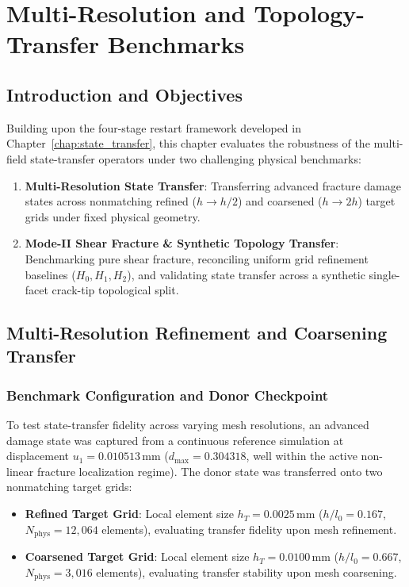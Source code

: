 \chapter{Multi-Resolution and Topology-Transfer Benchmarks}
\label{chap:multiresolution_topology}

\section{Introduction and Objectives}
\label{sec:topo_intro}

Building upon the four-stage restart framework developed in Chapter~\ref{chap:state_transfer}, this chapter evaluates the robustness of the multi-field state-transfer operators under two challenging physical benchmarks:
\begin{enumerate}
    \item \textbf{Multi-Resolution State Transfer}: Transferring advanced fracture damage states across nonmatching refined ($h \to h/2$) and coarsened ($h \to 2h$) target grids under fixed physical geometry.
    \item \textbf{Mode-II Shear Fracture \& Synthetic Topology Transfer}: Benchmarking pure shear fracture, reconciling uniform grid refinement baselines ($H_0, H_1, H_2$), and validating state transfer across a synthetic single-facet crack-tip topological split.
\end{enumerate}

\section{Multi-Resolution Refinement and Coarsening Transfer}
\label{sec:topo_multiresolution}

\subsection{Benchmark Configuration and Donor Checkpoint}
To test state-transfer fidelity across varying mesh resolutions, an advanced damage state was captured from a continuous reference simulation at displacement $u_1 = 0.010513\,\text{mm}$ ($d_{\max} = 0.304318$, well within the active non-linear fracture localization regime). The donor state was transferred onto two nonmatching target grids:
\begin{itemize}
    \item \textbf{Refined Target Grid}: Local element size $h_T = 0.0025\,\text{mm}$ ($h/l_0 = 0.167$, $N_{\mathrm{phys}} = 12,064$ elements), evaluating transfer fidelity upon mesh refinement.
    \item \textbf{Coarsened Target Grid}: Local element size $h_T = 0.0100\,\text{mm}$ ($h/l_0 = 0.667$, $N_{\mathrm{phys}} = 3,016$ elements), evaluating transfer stability upon mesh coarsening.
\end{itemize}

